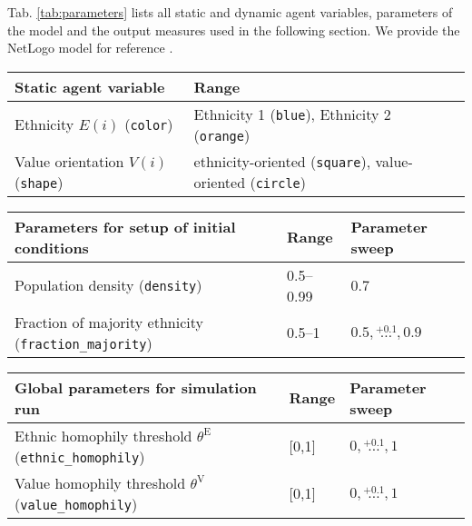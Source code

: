 \documentclass{ws-acs}
\begin{document}
{Tab. \ref{tab:parameters} lists all static and dynamic agent variables, parameters of the model and the output measures used in the following section. We provide the NetLogo model for reference \cite{PaolilloLorenz2018ValueSegregation}.  

\begin{table}
\centering 

\begin{tabular}{lll}
 Static agent variable                      & Range                               \\ \midrule\midrule
 Ethnicity $E(i)$  (\texttt{color})         & Ethnicity 1 (\texttt{blue}), Ethnicity 2 (\texttt{orange})         \\
 Value orientation $V(i)$  (\texttt{shape}) & ethnicity-oriented  (\texttt{square}), value-oriented  (\texttt{circle}) \\
 \bottomrule
\end{tabular}

\bigskip

\begin{tabular}{lll}
 Parameters for setup of initial conditions    & Range   & Parameter sweep  \\ \midrule\midrule
 Population density (\texttt{density})                       & 0.5--0.99   & 0.7          \\
 Fraction of majority ethnicity (\texttt{fraction\_majority}) & 0.5--1      & $0.5,\stackrel{+0.1}{\dots}, 0.9$  \\
 \bottomrule
\end{tabular}

\bigskip

\begin{tabular}{lll}
 Global parameters for simulation run    & Range   & Parameter sweep  \\ \midrule\midrule
 Ethnic homophily threshold $\theta^\text{E}$ (\texttt{ethnic\_homophily}) & [0,1]   & $0,\stackrel{+0.1}{\dots}, 1$ \\
 Value homophily threshold $\theta^\text{V}$ (\texttt{value\_homophily}) & [0,1]   & $0,\stackrel{+0.1}{\dots}, 1$  \\
 \bottomrule
\end{tabular}
\bigskip


\end{table}}
\end{document}
